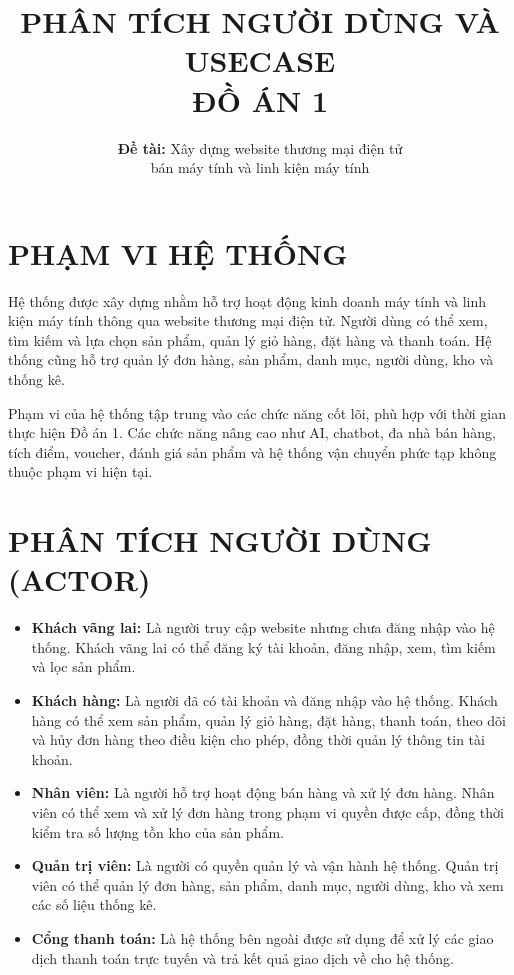 \documentclass[12pt,a4paper]{article}
\title{\textbf{PHÂN TÍCH NGƯỜI DÙNG VÀ USECASE}\\
\Large ĐỒ ÁN 1}
\author{
\textbf{Đề tài:} Xây dựng website thương mại điện tử\\
bán máy tính và linh kiện máy tính
}
\date{}
\begin{document}
\maketitle

\section{PHẠM VI HỆ THỐNG}

Hệ thống được xây dựng nhằm hỗ trợ hoạt động kinh doanh máy tính và linh kiện máy tính thông qua website thương mại điện tử. Người dùng có thể xem, tìm kiếm và lựa chọn sản phẩm, quản lý giỏ hàng, đặt hàng và thanh toán. Hệ thống cũng hỗ trợ quản lý đơn hàng, sản phẩm, danh mục, người dùng, kho và thống kê.

Phạm vi của hệ thống tập trung vào các chức năng cốt lõi, phù hợp với thời gian thực hiện Đồ án 1. Các chức năng nâng cao như AI, chatbot, đa nhà bán hàng, tích điểm, voucher, đánh giá sản phẩm và hệ thống vận chuyển phức tạp không thuộc phạm vi hiện tại.

\section{PHÂN TÍCH NGƯỜI DÙNG (ACTOR)}

\begin{itemize}

    \item \textbf{Khách vãng lai:} Là người truy cập website nhưng chưa đăng nhập vào hệ thống. Khách vãng lai có thể đăng ký tài khoản, đăng nhập, xem, tìm kiếm và lọc sản phẩm.

    \item \textbf{Khách hàng:} Là người đã có tài khoản và đăng nhập vào hệ thống. Khách hàng có thể xem sản phẩm, quản lý giỏ hàng, đặt hàng, thanh toán, theo dõi và hủy đơn hàng theo điều kiện cho phép, đồng thời quản lý thông tin tài khoản.

    \item \textbf{Nhân viên:} Là người hỗ trợ hoạt động bán hàng và xử lý đơn hàng. Nhân viên có thể xem và xử lý đơn hàng trong phạm vi quyền được cấp, đồng thời kiểm tra số lượng tồn kho của sản phẩm.

    \item \textbf{Quản trị viên:} Là người có quyền quản lý và vận hành hệ thống. Quản trị viên có thể quản lý đơn hàng, sản phẩm, danh mục, người dùng, kho và xem các số liệu thống kê.

    \item \textbf{Cổng thanh toán:} Là hệ thống bên ngoài được sử dụng để xử lý các giao dịch thanh toán trực tuyến và trả kết quả giao dịch về cho hệ thống.

\end{itemize}
\end{document}
